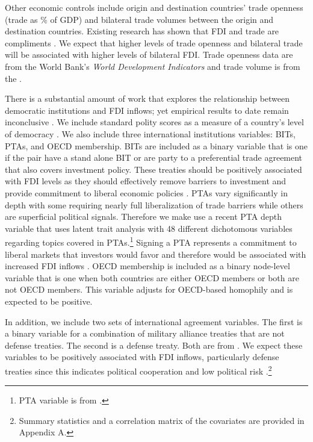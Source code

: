 \documentclass[reqno,onecolumn,letterpaper,12pt]{article}
\begin{document}
Other economic controls include origin and destination countries' trade openness (trade as \% of GDP) and bilateral trade volumes between the origin and destination countries. Existing research has shown that FDI and trade are compliments \citep{aizenman2006fdi,Markusen:1995}. We expect that higher levels of trade openness and bilateral trade will be associated with higher levels of bilateral FDI. Trade openness data are from the World Bank's \textit{World Development Indicators} and trade volume is from the \citet{OECD}.

There is a substantial amount of work that explores the relationship between democratic institutions and FDI inflows; yet empirical results to date remain inconclusive \citep[see,~e.g.,][]{Jensen:2003,Jakobsen_DeSoysa:2006,Li_et_al:2018,Wright_Zhu:2018,Arel-Bundock:2017b,Busse_Hefeker:2007}. We include standard polity scores as a measure of a country's level of democracy \citep{Marshall_Jaggers:2010}. We also include three international institutions variables: BITs, PTAs, and OECD membership. BITs are included as a binary variable that is one if the pair have a stand alone BIT or are party to a preferential trade agreement that also covers investment policy. These treaties should be positively associated with FDI levels as they should effectively remove barriers to investment and provide commitment to liberal economic policies \citep[e.g.,][]{Buthe_Milner:2008,Allee_Peinhardt:2011,Medvedev:2012,Osnago_et_al:2017}. PTAs vary significantly in depth with some requiring nearly full liberalization of trade barriers while others are superficial political signals. Therefore we make use a recent PTA depth variable that uses latent trait analysis with 48 different dichotomous variables regarding topics covered in PTAs.\footnote{PTA variable is from \citet{dur2014design}.} Signing a PTA represents a commitment to liberal markets that investors would favor and therefore would be associated with increased FDI inflows \citep{Buthe_Milner:2008,buthe2014foreign}. OECD membership is included as a binary node-level variable that is one when both countries are either OECD members or both are not OECD members. This variable adjusts for OECD-based homophily and is expected to be positive.


In addition, we include two sets of international agreement variables. The first is a binary variable for a combination of military alliance treaties that are not defense treaties. The second is a defense treaty. Both are from \citet{Gibler09}. We expect these variables to be positively associated with FDI inflows, particularly defense treaties since this indicates political cooperation and low political risk \citep{Li_Vashchilko:2010}.\footnote{Summary statistics and a correlation matrix of the covariates are provided in Appendix A.}
\end{document}
